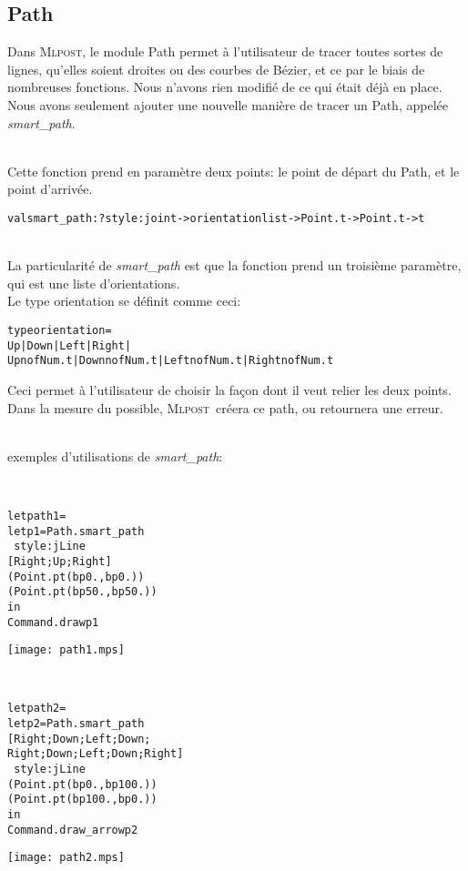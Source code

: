 \documentclass[a4paper,12pt]{article}
\newcommand{\mlpost}{\textsc{Mlpost}}
\begin{document}
\subsection{Path}
Dans \mlpost, le module Path permet à l'utilisateur de tracer toutes sortes de lignes, qu'elles soient droites ou des courbes de Bézier, et ce par le biais de nombreuses fonctions.
Nous n'avons rien modifié de ce qui était déjà en place. Nous avons seulement ajouter une nouvelle manière de tracer un Path, appelée \textit{smart\_path}. 

~\\Cette fonction prend en paramètre deux points: le point de départ du Path, et le point d'arrivée. 
\begin{alltt}
  val smart_path : ?style:joint -> orientation list -> Point.t -> Point.t -> t
\end{alltt}
~\\La particularité de \textit{smart\_path} est que la fonction prend un troisième paramètre, qui est une liste d'orientations.
~\\Le type orientation se définit comme ceci:
\begin{alltt}
  type orientation =
  Up | Down | Left | Right |
  Upn of Num.t | Downn of Num.t | Leftn of Num.t | Rightn of Num.t
\end{alltt}
Ceci permet à l'utilisateur de choisir la façon dont il veut relier les deux points. Dans la mesure du possible, \mlpost\ créera ce path, ou retournera une erreur. 

~\\exemples d'utilisations de \textit{smart\_path}:

~\\
\begin{minipage}{0.5\linewidth}
  \begin{alltt}
    let path1 = 
    let p1 = Path.smart_path 
    ~style:jLine
    [Right;Up;Right]
    (Point.pt (bp 0.,bp 0.)) 
    (Point.pt (bp 50.,bp 50.))
    in
    Command.draw p1
  \end{alltt}
\end{minipage}
\begin{minipage}{0.5\linewidth}
\begin{center}
\texttt{[image: path1.mps]}
\end{center}
\end{minipage}

~\\
\begin{minipage}{0.5\linewidth}
  \begin{alltt}
    let path2 = 
    let p2 = Path.smart_path 
    [Right;Down;Left;Down;
      Right;Down;Left;Down;Right]
    ~style:jLine
    (Point.pt (bp 0.,bp 100.)) 
    (Point.pt (bp 100.,bp 0.))
    in
    Command.draw_arrow p2
  \end{alltt}
\end{minipage}
\begin{minipage}{0.5\linewidth}
\begin{center}
\texttt{[image: path2.mps]}
\end{center}
\end{minipage}
\end{document}
